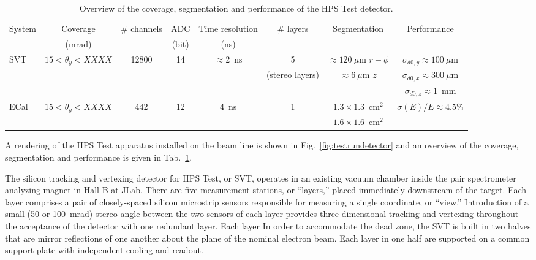 \documentclass[final,3p,times,twocolumn]{elsarticle}
\begin{document}
\begin{center}
\begin{table}[t]
{\small
\caption{Overview of the coverage, segmentation and performance of the HPS Test detector. }
\begin{tabular}{lccccccc}
\hline 
System & Coverage & \# channels & ADC & Time resolution & \# layers & Segmentation & Performance \\
 & (mrad) &  & (bit) & (ns) &  &  &  \\
\hline
SVT & $15<\theta_{y} < XXXX$ & 12800 & 14 & $\approx 2$~ns & 5  & $\approx 120~\mu$m $r-\phi$ & $\sigma_{d0,y}  \approx 100~\mu$m \\
& &  &  &  & (stereo layers) & $\approx 6~\mu$m $z$ & $\sigma_{d0,x} \approx 300~\mu$m \\
& &  &  &  &  &  & $\sigma_{d0,z}\approx 1$~mm \\
\hline
ECal & $15<\theta_{y} < XXXX$ & 442 & 12 & 4~ns & 1 & $1.3\times1.3$~cm$^2$  & $\sigma(E)/E \approx 4.5\%$ \\ 
 &  &  &  &  &  & $1.6\times1.6$~cm$^2$  &  \\ 
\hline
\end{tabular}
\label{tab:detector-overview}
}
\end{table}
\end{center}
A rendering of the HPS Test apparatus installed on the beam line is shown in 
Fig.~\ref{fig:testrundetector} and an overview of the coverage, segmentation and performance is 
given in Tab.~\ref{tab:detector-overview}.  

The silicon tracking and vertexing detector for HPS Test, or SVT, operates in an existing vacuum 
chamber inside the pair spectrometer analyzing magnet in Hall B at JLab.  There are five 
measurement stations, or ``layers,'' placed immediately downstream of the target. Each layer 
comprises a pair of closely-spaced silicon microstrip sensors responsible for measuring a single 
coordinate, or ``view.'' Introduction of a small (50 or 100~mrad) stereo angle between the two 
sensors of each layer provides three-dimensional tracking and vertexing throughout the acceptance 
of the detector with one redundant layer. Each layer In order to accommodate the dead zone, the 
SVT is built in two halves that are mirror reflections of one another about the plane of the nominal 
electron beam.  Each layer in one half are supported on a common support plate with independent 
cooling and readout. 
\end{document}
